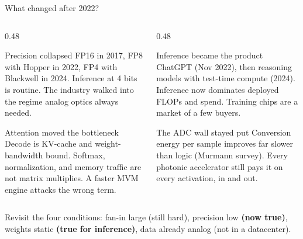 \documentclass[aspectratio=169,10pt]{beamer}
\begin{document}
\begin{frame}{What changed after 2022?}
\begin{columns}[T]
\begin{column}{0.48\textwidth}
\begin{block}{Precision collapsed}
\small FP16 in 2017, FP8 with Hopper in 2022, FP4 with Blackwell in 2024. Inference at 4 bits is routine. The industry walked into the regime analog optics always needed.
\end{block}
\begin{block}{Attention moved the bottleneck}
\small Decode is KV-cache and weight-bandwidth bound. Softmax, normalization, and memory traffic are not matrix multiplies. A faster MVM engine attacks the wrong term.
\end{block}
\end{column}
\begin{column}{0.48\textwidth}
\begin{block}{Inference became the product}
\small ChatGPT (Nov 2022), then reasoning models with test-time compute (2024). Inference now dominates deployed FLOPs and spend. Training chips are a market of a few buyers.
\end{block}
\begin{block}{The ADC wall stayed put}
\small Conversion energy per sample improves far slower than logic (Murmann survey). Every photonic accelerator still pays it on every activation, in and out.
\end{block}
\end{column}
\end{columns}
\vspace{6pt}
\begin{center}
{\small Revisit the four conditions: fan-in large \textcolor{slate}{(still hard)}, precision low \textcolor{moss}{\textbf{(now true)}}, weights static \textcolor{moss}{\textbf{(true for inference)}}, data already analog \textcolor{slate}{(not in a datacenter)}.}
\end{center}
\end{frame}
\end{document}
